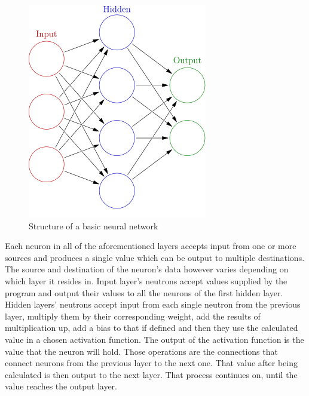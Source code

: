 \documentclass{ijisa}
\begin{document}
\begin{figure}[!h]
\centering
\includegraphics[width=.8\columnwidth]{Images/Colored_neural_network}
\caption{Structure of a basic neural network} \label{fig:fig1}
\end{figure}

Each neuron in all of the aforementioned layers accepts input from one or more sources and produces a single value which can be output to multiple destinations. The source and destination of the neuron's data however varies depending on which layer it resides in. Input layer's neutrons accept values supplied by the program and output their values to all the neurons of the first hidden layer. Hidden layers' neutrons accept input from each single neutron from the previous layer, multiply them by their corresponding weight, add the results of multiplication up, add a bias to that if defined and then they use the calculated value in a chosen activation function. The output of the activation function is the value that the neuron will hold. Those operations are the connections that connect neurons from the previous layer to the next one. That value after being calculated is then output to the next layer. That process continues on, until the value reaches the output layer.
\end{document}
